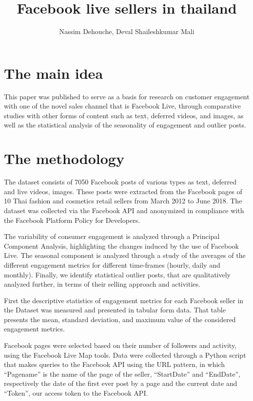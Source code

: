 \documentclass[a4paper]{article}
\title{Facebook live sellers in thailand}
\author[1]{Nassim Dehouche, Deval Shaileshkumar Mali}
\begin{document}
\maketitle
\section{The main idea}

This paper was published to serve as a basis for research on customer engagement with one of the novel sales channel that is Facebook Live, through comparative studies with other forms of content such as text, deferred videos, and images, as well as the statistical analysis of the seasonality of engagement and outlier posts.

\section{The methodology }

The dataset consists of 7050 Facebook posts of various types as text, deferred and live videos, images. These posts were extracted from the Facebook pages of 10 Thai fashion and cosmetics retail sellers from March 2012 to June 2018. The dataset was collected via the Facebook API and anonymized in compliance with the Facebook Platform Policy for Developers. 

The variability of consumer engagement is analyzed through a Principal Component Analysis, highlighting the changes induced by the use of Facebook Live. The seasonal component is analyzed through a study of the averages of the different engagement metrics for different time-frames (hourly, daily and monthly). Finally, we identify statistical outlier posts, that are qualitatively analyzed further, in terms of their selling approach and activities.

First the descriptive statistics of engagement metrics for each Facebook seller in the Dataset was measured and presented in tabular form data. That table presents the mean, standard deviation, and maximum value of the considered engagement metrics.

Facebook pages were selected based on their number of followers and activity, using the Facebook Live Map tools. Data were collected through a Python script that makes queries to the Facebook API using the URL pattern, in which “Pagename” is the name of the page of the seller, “StartDate” and “EndDate”, respectively the date of the first ever post by a page and the current date and “Token”, our access token to the Facebook API. 
\end{document}
